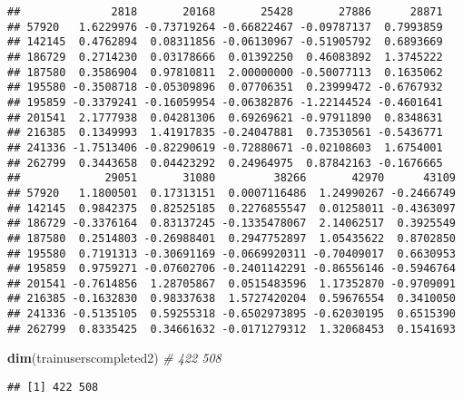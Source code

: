 \documentclass[]{article}
\newenvironment{Shaded}{\begin{snugshade}}{\end{snugshade}}
\newcommand{\CommentTok}[1]{\textcolor[rgb]{0.56,0.35,0.01}{\textit{#1}}}
\newcommand{\KeywordTok}[1]{\textcolor[rgb]{0.13,0.29,0.53}{\textbf{#1}}}
\newcommand{\NormalTok}[1]{#1}
\begin{document}
\begin{verbatim}
##              2818       20168       25428       27886      28871
## 57920   1.6229976 -0.73719264 -0.66822467 -0.09787137  0.7993859
## 142145  0.4762894  0.08311856 -0.06130967 -0.51905792  0.6893669
## 186729  0.2714230  0.03178666  0.01392250  0.46083892  1.3745222
## 187580  0.3586904  0.97810811  2.00000000 -0.50077113  0.1635062
## 195580 -0.3508718 -0.05309896  0.07706351  0.23999472 -0.6767932
## 195859 -0.3379241 -0.16059954 -0.06382876 -1.22144524 -0.4601641
## 201541  2.1777938  0.04281306  0.69269621 -0.97911890  0.8348631
## 216385  0.1349993  1.41917835 -0.24047881  0.73530561 -0.5436771
## 241336 -1.7513406 -0.82290619 -0.72880671 -0.02108603  1.6754001
## 262799  0.3443658  0.04423292  0.24964975  0.87842163 -0.1676665
##             29051       31080         38266       42970      43109
## 57920   1.1800501  0.17313151  0.0007116486  1.24990267 -0.2466749
## 142145  0.9842375  0.82525185  0.2276855547  0.01258011 -0.4363097
## 186729 -0.3376164  0.83137245 -0.1335478067  2.14062517  0.3925549
## 187580  0.2514803 -0.26988401  0.2947752897  1.05435622  0.8702850
## 195580  0.7191313 -0.30691169 -0.0669920311 -0.70409017  0.6630953
## 195859  0.9759271 -0.07602706 -0.2401142291 -0.86556146 -0.5946764
## 201541 -0.7614856  1.28705867  0.0515483596  1.17352870 -0.9709091
## 216385 -0.1632830  0.98337638  1.5727420204  0.59676554  0.3410050
## 241336 -0.5135105  0.59255318 -0.6502973895 -0.62030195  0.6515390
## 262799  0.8335425  0.34661632 -0.0171279312  1.32068453  0.1541693
\end{verbatim}

\begin{Shaded}
\begin{Highlighting}[]
\KeywordTok{dim}\NormalTok{(trainuserscompleted2) }\CommentTok{# 422 508}
\end{Highlighting}
\end{Shaded}

\begin{verbatim}
## [1] 422 508
\end{verbatim}
\end{document}
